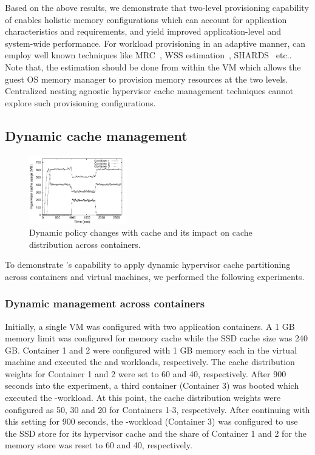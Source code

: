 Based on the above results, 
we demonstrate that two-level provisioning capability of \dd{} enables
holistic memory configurations which can account for application
characteristics and requirements, and yield improved application-level
and system-wide performance.
%
For workload provisioning in an adaptive manner,
\dd{} can employ well known techniques like MRC~\cite{mrc,membal},
 WSS estimation~\cite{wss,wsslow}, SHARDS~\cite{shards} etc..
%
Note that, the estimation should be done from within the VM which allows the
guest OS memory manager to provision memory resources at the two levels.
%
Centralized nesting agnostic hypervisor cache management techniques
cannot explore such provisioning configurations.
%
%
\subsection{Dynamic cache management}
\begin{figure}[t]
  \centering
\includegraphics[width=0.38\textwidth]{data/dynamic_containers/musage}
\vspace{-0.2cm}
 \caption{Dynamic policy changes with \dd{} cache and its impact on cache 
          distribution across containers.}
\vspace{-0.55cm}
 \label{fig:dyn_distrib}
\end{figure} 
%
To demonstrate \dd's capability to apply dynamic hypervisor cache
partitioning across containers and virtual machines, we performed the
following experiments.
%
\subsubsection{Dynamic management across containers}
Initially, a single VM was configured with two application containers.
%
%
A 1 GB memory limit was configured for \dd{} memory cache while 
the SSD cache size was 240 GB.
%
Container 1 and 2 were configured with 1 GB memory each in the
virtual machine and 
executed the \web{} and \proxy{} workloads, respectively.  
%
The \dd{} cache distribution weights 
for Container 1 and 2 were set to 60 and 40, respectively.
%
After 900 seconds into the experiment, a third container (Container 3) was booted 
which executed the \video-workload.  
%
At this point, the \dd{} cache distribution weights were configured as
50, 30 and 20 for Containers 1-3, respectively.
%
After continuing with this setting for 900 seconds, the 
\video-workload (Container 3)
was configured to use the SSD store for its hypervisor cache and 
the share of Container 1 and 2 for the memory store
was reset to 60 and 40, respectively.

